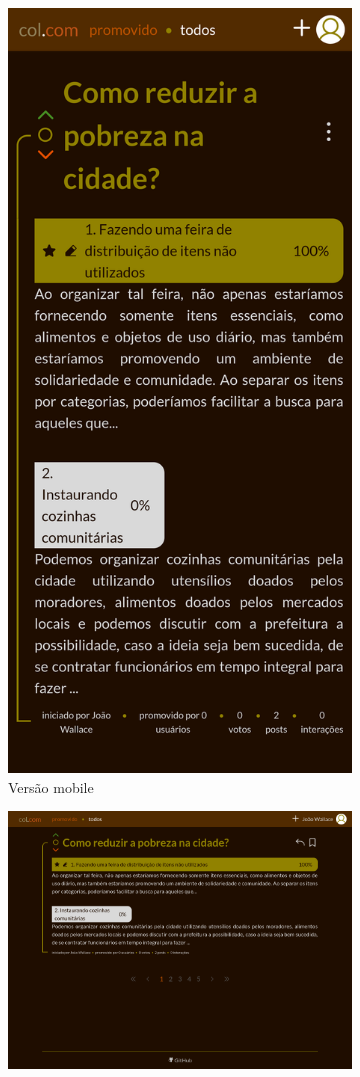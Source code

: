 \begin{figure}[hbt!]
\centering
\begin{subfigure}{.3\textwidth}
  \centering
  \includegraphics[width=.7\linewidth]{imagens/captures/m_topics.png}
  \caption{Versão mobile}
\end{subfigure}%
\begin{subfigure}{.7\textwidth}
  \centering
  \includegraphics[width=0.9\linewidth]{imagens/captures/topics.png}

\end{subfigure}
\end{figure}

